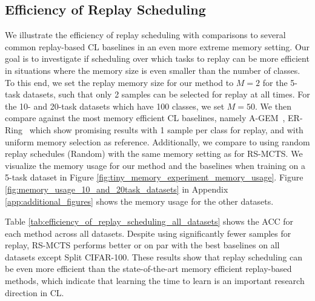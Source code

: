 




\subsection{Efficiency of Replay Scheduling}
\label{sec:efficiency_of_replay_scheduling}



We illustrate the efficiency of replay scheduling with comparisons to several common replay-based CL baselines in an even more extreme memory setting.
Our goal is to investigate if scheduling over which tasks to replay can be more efficient in situations where the memory size is even smaller than the number of classes. %
To this end, we set the replay memory size for our method
to $M=2$ for the 5-task datasets, such that only 2 samples can be selected for replay at all times. For the 10- and 20-task datasets which have 100 classes, we set $M=50$. We then compare against the most memory efficient CL baselines, namely A-GEM~\citep{chaudhry2018efficient}, ER-Ring~\citep{chaudhry2019tiny} which show promising results with 1 sample per class for replay, %
and with uniform memory selection as reference. 
Additionally, we compare to using random replay schedules (Random) with the same memory setting as for RS-MCTS.
We visualize the memory usage for our method and the baselines when training on a 5-task dataset in Figure \ref{fig:tiny_memory_experiment_memory_usage}. 
Figure \ref{fig:memory_usage_10_and_20task_datasets} in Appendix \ref{app:additional_figures} shows the memory usage for the other datasets.

Table \ref{tab:efficiency_of_replay_scheduling_all_datasets} shows the ACC for each method across all datasets. Despite using significantly fewer samples for replay, RS-MCTS performs better or on par with the best baselines on all datasets except Split CIFAR-100. These results show that replay scheduling can be even more efficient than the state-of-the-art memory efficient replay-based methods, which indicate that learning the time to learn is an important research direction in CL.



